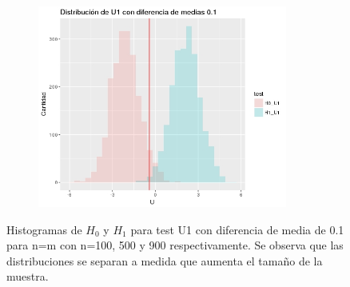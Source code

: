 \documentclass[%
 reprint,
 amsmath,amssymb,
 aps,
spanish]{revtex4-1}
\begin{document}
\begin{figure}[t]
\begin{subfigure}[t]{0.3\textwidth}
      \includegraphics[width=0.9\textwidth]{imagenes/histograma_U1_01_900}
    \end{subfigure}
    \label{fig:histogramas_poder_01}
    \caption{Histogramas de $H_0$ y $H_1$ para test U1 con diferencia de media de 0.1 para n=m con n=100, 500 y 900 respectivamente. Se observa que las distribuciones se separan a medida que aumenta 
el tamaño de la muestra.}
\end{figure}
\end{document}
